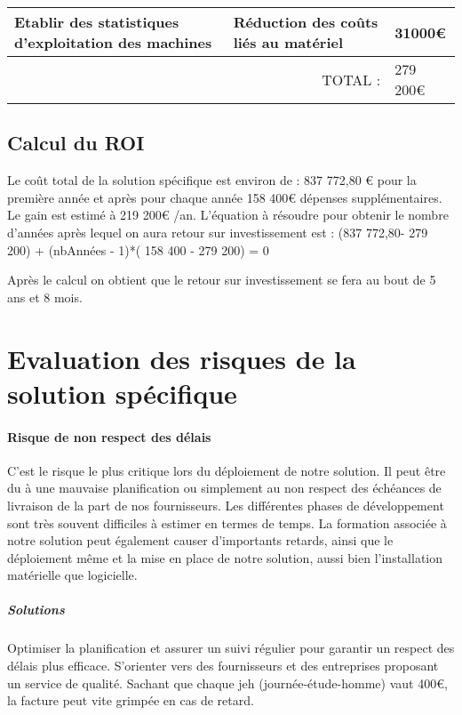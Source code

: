 \begin{tabular}{|p{7cm}|p{5cm}|p{2cm}|}
Etablir des statistiques d'exploitation des machines
                                  & Réduction des coûts liés au matériel
                                                          &  31000€ \\ \hline  
\multicolumn{2}{|r|}{TOTAL :} & 279 200€ \\ \hline                                                                                                                                                                                                                      
      
\end{tabular}
        
\subsection{Calcul du ROI}

Le coût total de la solution spécifique est environ de : 837 772,80 € pour la première année et après pour chaque année 158 400€ dépenses supplémentaires. Le gain est estimé à 219 200€ /an. L'équation à résoudre pour obtenir le nombre
d'années après lequel on aura retour sur investissement est : (837 772,80- 279 200) + (nbAnnées - 1)*( 158 400 - 279 200) = 0

Après le calcul on obtient que le retour sur investissement se fera au bout de 5 ans et 8 mois.


\section{Evaluation des risques de la solution spécifique}

\paragraph{Risque de non respect des délais\\}
C'est le risque le plus critique lors du déploiement de notre solution. Il peut être du à une mauvaise planification ou simplement au non respect des échéances de livraison de la part de nos fournisseurs. Les différentes phases de développement sont très souvent difficiles à estimer en termes de temps.
La formation associée à notre solution peut également causer d'importants retards, ainsi que le déploiement même et la mise en place de notre solution, aussi bien l'installation matérielle que logicielle.

\subparagraph{Solutions\\}
Optimiser la planification et assurer un suivi régulier pour garantir un respect des délais plus efficace. S'orienter vers des fournisseurs et des entreprises proposant un service de qualité. Sachant que chaque jeh (journée-étude-homme) vaut 400€, la facture peut vite grimpée en cas de retard.

